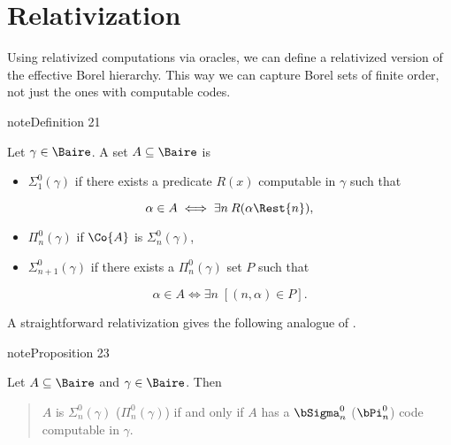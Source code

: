 \documentclass[letterpaper,10pt,english]{jupyterBook}
\begin{document}
\section{Relativization}
\label{\detokenize{codingBorel:relativization}}
\sphinxAtStartPar
Using relativized computations via oracles, we can define a relativized version of the effective Borel hierarchy. This way we can capture  Borel sets of finite order, not just the ones with computable codes.
\label{codingBorel:definition-7}
\begin{sphinxadmonition}{note}{Definition 21}



\sphinxAtStartPar
Let \(\gamma \in \Baire\). A set \(A \subseteq \Baire\) is
\begin{itemize}
\item {} 
\sphinxAtStartPar
{} \(\Sigma^0_1(\gamma)\) if there exists a predicate \(R(x)\) computable in \(\gamma\) such that

\end{itemize}
\begin{equation*}
\alpha \in A \iff \exists n \: R(\alpha\Rest{n}),
\end{equation*}\begin{itemize}
\item {} 
\sphinxAtStartPar
{} \(\Pi^0_n(\gamma)\) if \(\Co{A}\) is \(\Sigma^0_n(\gamma)\),

\item {} 
\sphinxAtStartPar
{} \(\Sigma^0_{n+1}(\gamma)\) if there exists a \(\Pi^0_n(\gamma)\) set \(P\) such that

\end{itemize}
\begin{equation*}
\alpha \in A \iff \exists n \;[(n,\alpha) \in P].
\end{equation*}\end{sphinxadmonition}

\sphinxAtStartPar
A straightforward relativization gives the following analogue of {\hyperref[\detokenize{codingBorel:prop-computable-codes}]{}}.
\label{codingBorel:prop-relative-codes}
\begin{sphinxadmonition}{note}{Proposition 23}



\sphinxAtStartPar
Let \(A \subseteq \Baire\) and \(\gamma \in \Baire\). Then
\begin{quote}

\sphinxAtStartPar
\(A\) is \(\Sigma^0_n(\gamma)\) (\(\Pi^0_n(\gamma)\)) if and only if \(A\) has a \(\bSigma^0_n\) (\(\bPi^0_n\)) code computable in \(\gamma\).
\end{quote}
\end{sphinxadmonition}
\end{document}
